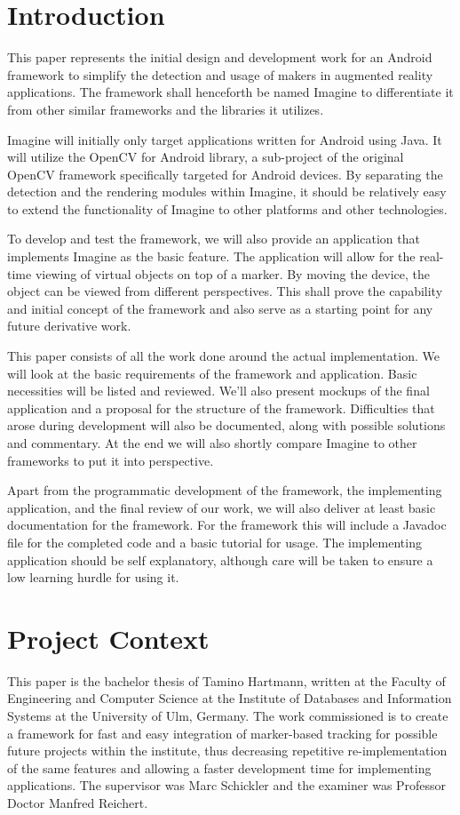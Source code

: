 \section{Introduction}

This paper represents the initial design and development work for an Android framework to simplify the detection and usage of makers in augmented reality applications.
The framework shall henceforth be named Imagine to differentiate it from other similar frameworks and the libraries it utilizes.

Imagine will initially only target applications written for Android\cite{android} using Java.
It will utilize the OpenCV for Android\cite{opencvandroid} library, a sub-project of the original OpenCV framework\cite{opencv} specifically targeted for Android devices.
By separating the detection and the rendering modules within Imagine, it should be relatively easy to extend the functionality of Imagine to other platforms and other technologies.

To develop and test the framework, we will also provide an application that implements Imagine as the basic feature.
The application will allow for the real-time viewing of virtual objects on top of a marker.
By moving the device, the object can be viewed from different perspectives.
This shall prove the capability and initial concept of the framework and also serve as a starting point for any future derivative work.

This paper consists of all the work done around the actual implementation.
We will look at the basic requirements of the framework and application.
Basic necessities will be listed and reviewed.
We'll also present mockups of the final application and a proposal for the structure of the framework.
Difficulties that arose during development will also be documented, along with possible solutions and commentary.
At the end we will also shortly compare Imagine to other frameworks to put it into perspective.

Apart from the programmatic development of the framework, the implementing application, and the final review of our work, we will also deliver at least basic documentation for the framework.
For the framework this will include a Javadoc\cite{docjava} file for the completed code and a basic tutorial for usage.
The implementing application should be self explanatory, although care will be taken to ensure a low learning hurdle for using it.

\section{Project Context}

This paper is the bachelor thesis of Tamino Hartmann, written at the Faculty of Engineering and Computer Science\cite{faculty} at the Institute of Databases and Information Systems at the University of Ulm\cite{ulmuni}, Germany.
The work commissioned is to create a framework for fast and easy integration of marker-based tracking for possible future projects within the institute, thus decreasing repetitive re-implementation of the same features and allowing a faster development time for implementing applications.
The supervisor was Marc Schickler and the examiner was Professor Doctor Manfred Reichert.
